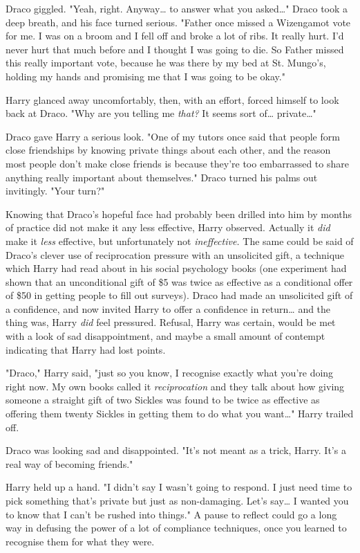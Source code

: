 Draco giggled. "Yeah, right. Anyway{\ldots} to answer what you asked{\ldots}"
Draco took a deep breath, and his face turned serious. "Father once missed a
Wizengamot vote for me. I was on a broom and I fell off and broke a lot of
ribs. It really hurt. I'd never hurt that much before and I thought I was going
to die. So Father missed this really important vote, because he was there by my
bed at St. Mungo's, holding my hands and promising me that I was going to be
okay."

Harry glanced away uncomfortably, then, with an effort, forced himself to look
back at Draco. "Why are you telling me \emph{that?} It seems sort of{\ldots}
private{\ldots}"

Draco gave Harry a serious look. "One of my tutors once said that people form
close friendships by knowing private things about each other, and the reason
most people don't make close friends is because they're too embarrassed to
share anything really important about themselves." Draco turned his palms out
invitingly. "Your turn?"

Knowing that Draco's hopeful face had probably been drilled into him by months
of practice did not make it any less effective, Harry observed. Actually it
\emph{did} make it \emph{less} effective, but unfortunately not
\emph{ineffective.} The same could be said of Draco's clever use of
reciprocation pressure with an unsolicited gift, a technique which Harry had
read about in his social psychology books (one experiment had shown that an
unconditional gift of \$5 was twice as effective as a conditional offer of \$50
in getting people to fill out surveys). Draco had made an unsolicited gift of a
confidence, and now invited Harry to offer a confidence in return{\ldots} and
the thing was, Harry \emph{did} feel pressured. Refusal, Harry was certain,
would be met with a look of sad disappointment, and maybe a small amount of
contempt indicating that Harry had lost points.

"Draco," Harry said, "just so you know, I recognise exactly what you're doing
right now. My own books called it \emph{reciprocation} and they talk about how
giving someone a straight gift of two Sickles was found to be twice as
effective as offering them twenty Sickles in getting them to do what you
want{\ldots}" Harry trailed off.

Draco was looking sad and disappointed. "It's not meant as a trick, Harry. It's
a real way of becoming friends."

Harry held up a hand. "I didn't say I wasn't going to respond. I just need time
to pick something that's private but just as non-damaging. Let's say{\ldots} I
wanted you to know that I can't be rushed into things." A pause to reflect
could go a long way in defusing the power of a lot of compliance techniques,
once you learned to recognise them for what they were.

